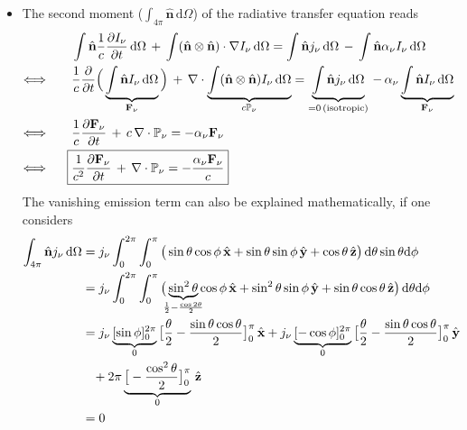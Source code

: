 \begin{itemize}
  \item The second moment ($\int_{4\pi}\hat{\textbf{n}}\,\mathrm{d}\Omega$) of the radiative transfer equation reads
  \begin{align*}
   &\int \hat{\textbf{n}}\frac{1}{c}\frac{\partial I_{\nu}}{\partial t} \,\mathrm{d}\Omega \,+\, \int (\hat{\textbf{n}}\otimes\hat{\textbf{n}})\cdot\nabla I_{\nu} \,\mathrm{d}\Omega = \int \hat{\textbf{n}} j_{\nu} \,\mathrm{d}\Omega \,-\, \int \hat{\textbf{n}} \alpha_{\nu}I_{\nu} \,\mathrm{d}\Omega \\
   \Longleftrightarrow\qquad
   &\frac{1}{c}\frac{\partial}{\partial t}\Big(\underbrace{ \int \hat{\textbf{n}}I_{\nu} \,\mathrm{d}\Omega }_{\textbf{F}_{\nu}}\Big) \,+\, \nabla\cdot\underbrace{ \int (\hat{\textbf{n}}\otimes\hat{\textbf{n}}) I_{\nu} \,\mathrm{d}\Omega }_{c\mathbb{P}_{\nu}} = \underbrace{ \int \hat{\textbf{n}} j_{\nu} \,\mathrm{d}\Omega }_{=0 \,(\text{isotropic})} \,-\, \alpha_{\nu}\underbrace{ \int \hat{\textbf{n}}I_{\nu} \,\mathrm{d}\Omega }_{\textbf{F}_{\nu}} \\
   \Longleftrightarrow\qquad
   &\frac{1}{c}\frac{\partial\textbf{F}_{\nu}}{\partial t} \,+\, c\,\nabla\cdot\mathbb{P}_{\nu} = - \alpha_{\nu}\textbf{F}_{\nu} \\
   \Longleftrightarrow\qquad\!\!
   \Aboxed{&\frac{1}{c^{2}}\frac{\partial\textbf{F}_{\nu}}{\partial t} \,+\, \nabla\cdot\mathbb{P}_{\nu} = - \frac{\alpha_{\nu}\textbf{F}_{\nu}}{c}}
  \end{align*}
  The vanishing emission term can also be explained mathematically, if one considers
  \begin{align*}
   \int_{4\pi}\hat{\textbf{n}} j_{\nu}\,\mathrm{d}\Omega &= j_{\nu} \int_{0}^{2\pi}\int_{0}^{\pi}\big(\sin{\theta}\cos{\phi}\,\hat{\textbf{x}} + \sin{\theta}\sin{\phi}\,\hat{\textbf{y}} + \cos{\theta}\,\hat{\textbf{z}} \big)\,\mathrm{d}\theta\sin{\theta}\mathrm{d}\phi \\
   &= j_{\nu} \int_{0}^{2\pi}\int_{0}^{\pi}\big(\underbrace{ \sin^{2}{\theta} }_{\mathclap{\frac{1}{2} - \frac{\cos{2\theta}}{2}}}\cos{\phi}\,\hat{\textbf{x}} + \sin^{2}{\theta}\sin{\phi}\,\hat{\textbf{y}} + \sin{\theta}\cos{\theta}\,\hat{\textbf{z}} \big)\,\mathrm{d}\theta\mathrm{d}\phi \\
   &= j_{\nu} \underbrace{ [\sin{\phi}]_{0}^{2\pi} }_{0}\big[\frac{\theta}{2}-\frac{\sin{\theta}\cos{\theta}}{2}\big]_{0}^{\pi}\,\hat{\textbf{x}} + j_{\nu} \underbrace{ [-\cos{\phi}]_{0}^{2\pi} }_{0}\big[\frac{\theta}{2} - \frac{\sin{\theta}\cos{\theta}}{2}\big]_{0}^{\pi}\,\hat{\textbf{y}} \\
   &\quad\! + 2\pi\underbrace{ \big[-\frac{\cos^{2}{\theta}}{2}\big]_{0}^{\pi} }_{0}\,\hat{\textbf{z}} \\
   &= 0
  \end{align*}

\end{itemize}
